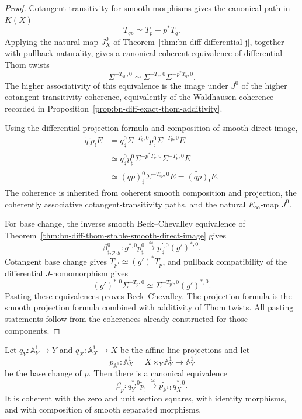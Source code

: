 \begin{proof}
Cotangent transitivity for smooth morphisms gives the canonical path in
\(K(X)\)
\[
  T_{qp}\simeq T_p+p^*T_q.
\]
Applying the natural map \(J_X^0\) of
Theorem~\ref{thm:bn-diff-differential-j}, together with pullback naturality,
gives a canonical coherent equivalence of differential Thom twists
\[
  \Sigma^{-T_{qp},0}
  \simeq
  \Sigma^{-T_p,0}\Sigma^{-p^*T_q,0}.
\]
The higher associativity of this equivalence is the image under \(J^0\) of the
higher cotangent-transitivity coherence, equivalently of the Waldhausen
coherence recorded in
Proposition~\ref{prop:bn-diff-exact-thom-additivity}.

Using the differential projection formula and composition of smooth direct
image,
\[
\begin{aligned}
\widetilde q_!\widetilde p_!E
&=
q_\sharp^0\Sigma^{-T_q,0}
  p_\sharp^0\Sigma^{-T_p,0}E\\
&\simeq
q_\sharp^0p_\sharp^0
  \Sigma^{-p^*T_q,0}\Sigma^{-T_p,0}E\\
&\simeq
(qp)_\sharp^0\Sigma^{-T_{qp},0}E
=
\widetilde{(qp)}_!E.
\end{aligned}
\]
The coherence is inherited from coherent smooth composition and projection,
the coherently associative cotangent-transitivity paths, and the natural
\(E_\infty\)-map \(J^0\).

For base change, the inverse smooth Beck--Chevalley equivalence of
Theorem~\ref{thm:bn-diff-thom-stable-smooth-direct-image} gives
\[
  \beta_{\sharp,p,g}^{0}:
  g^{*,0}p_\sharp^0
  \xrightarrow{\simeq}
  p_\sharp^{\prime,0}(g')^{*,0}.
\]
Cotangent base change gives \(T_{p'}\simeq(g')^*T_p\), and pullback
compatibility of the differential \(J\)-homomorphism gives
\[
  (g')^{*,0}\Sigma^{-T_p,0}
  \simeq
  \Sigma^{-T_{p'},0}(g')^{*,0}.
\]
Pasting these equivalences proves Beck--Chevalley.  The projection formula is
the smooth projection formula combined with additivity of Thom twists.  All
pasting statements follow from the coherences already constructed for those
components.
\end{proof}

\begin{corollary}
\label{cor:bn-diff-smooth-affine-line-beck-chevalley}
Let \(q_Y:\mathbb A^1_Y\to Y\) and \(q_X:\mathbb A^1_X\to X\) be the affine-line
projections and let
\[
  p_{\mathbb A^1}:\mathbb A^1_X
  =X\times_Y\mathbb A^1_Y
  \longrightarrow
  \mathbb A^1_Y
\]
be the base change of \(p\).  Then there is a canonical equivalence
\[
  \boxed{
  \beta_p:
  q_Y^{*,0}\widetilde p_!
  \xrightarrow{\simeq}
  \widetilde{p_{\mathbb A^1}}{}_!\,q_X^{*,0}.
  }
\]
It is coherent with the zero and unit section squares, with identity morphisms,
and with composition of smooth separated morphisms.
\end{corollary}

